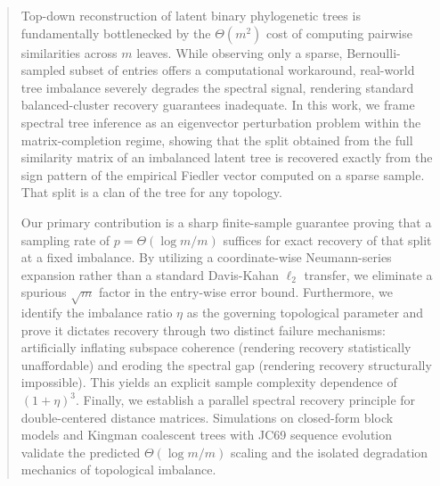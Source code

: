 \begin{abstract}
Top-down reconstruction of latent binary phylogenetic trees is fundamentally bottlenecked by the $\Theta(m^2)$ cost of computing pairwise similarities across $m$ leaves. While observing only a sparse, Bernoulli-sampled subset of entries offers a computational workaround, real-world tree imbalance severely degrades the spectral signal, rendering standard balanced-cluster recovery guarantees inadequate. 
In this work, we frame spectral tree inference as an eigenvector perturbation problem within the matrix-completion regime, showing that the split obtained from the full similarity matrix of an imbalanced latent tree is recovered exactly from the sign pattern of the empirical Fiedler vector computed on a sparse sample. That split is a clan of the tree for any topology.

Our primary contribution is a sharp finite-sample guarantee proving that a sampling rate of $p = \Theta(\log m / m)$ suffices for exact recovery of that split at a fixed imbalance. By utilizing a coordinate-wise Neumann-series expansion rather than a standard Davis-Kahan $\ell_2$ transfer, we eliminate a spurious $\sqrt{m}$ factor in the entry-wise error bound. 
Furthermore, we identify the imbalance ratio $\eta$ as the governing topological parameter and prove it dictates recovery through two distinct failure mechanisms: artificially inflating subspace coherence (rendering recovery statistically unaffordable) and eroding the spectral gap (rendering recovery structurally impossible). 
This yields an explicit sample complexity dependence of $(1+\eta)^3$. Finally, we establish a parallel spectral recovery principle for double-centered distance matrices. Simulations on closed-form block models and Kingman coalescent trees with JC69 sequence evolution validate the predicted $\Theta(\log m / m)$ scaling and the isolated degradation mechanics of topological imbalance.
\end{abstract}
